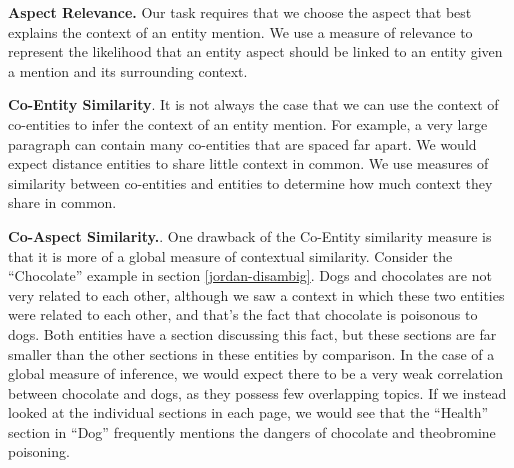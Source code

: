 \textbf{Aspect Relevance.} Our task requires that we choose the aspect that best explains the context of an entity mention. We use a measure of relevance to represent the likelihood that an entity aspect should be linked to an entity given a mention and its surrounding context.

\textbf{Co-Entity Similarity}. It is not always the case that we can use the context of co-entities to infer the context of an entity mention. For example, a very large paragraph can contain many co-entities that are spaced far apart. We would expect distance entities to share little context in common.
We use measures of similarity between co-entities and entities to determine how much context they share in common.

\textbf{Co-Aspect Similarity.}. One drawback of the Co-Entity similarity measure is that it is more of a global measure of contextual similarity. Consider the ``Chocolate'' example in section \ref{jordan-disambig}. Dogs and chocolates are not very related to each other, although we saw a context in which these two entities were related to each other, and that's the fact that chocolate is poisonous to dogs. Both entities have a section discussing this fact, but these sections are far smaller than the other sections in these entities by comparison. In the case of a global measure of inference, we would expect there to be a very weak correlation between chocolate and dogs, as they possess few overlapping topics. If we instead looked at the individual sections in each page, we would see that the ``Health'' section in ``Dog'' frequently mentions the dangers of chocolate and theobromine poisoning. 
